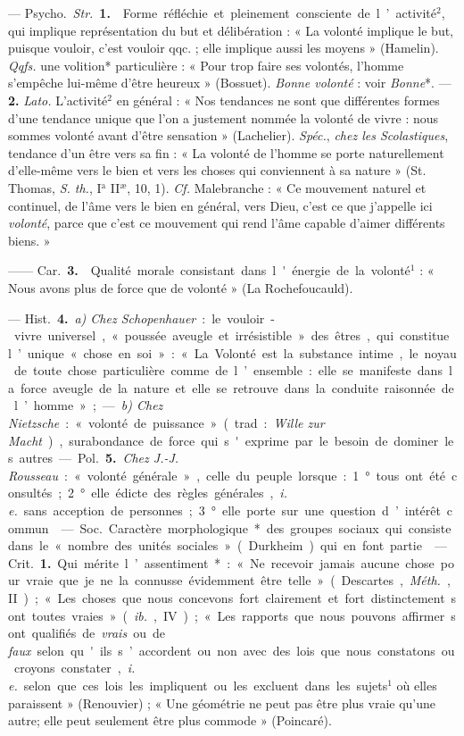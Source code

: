 \begin{itemize}[leftmargin=1cm, label=, itemsep=1pt]
 — \si{Psycho.} {\it Str.} {\bf 1.}  Forme
réfléchie et pleinement consciente de l’activité$^2$, qui implique
représentation du but et délibération : « La volonté implique le but, puisque
vouloir, c’est vouloir qqc. ; elle implique aussi les moyens » (Hamelin).
{\it Qqfs.}  une volition* particulière : « Pour trop faire
ses volontés, l’homme s’empêche lui-même d’être heureux » (Bossuet). {\it
Bonne volonté} : voir {\it Bonne}*. —  {\bf 2.}  {\it Lato.}
L'activité$^2$ en général : « Nos tendances ne sont que différentes formes
d’une tendance unique que l’on a justement nommée la volonté de vivre : nous
sommes volonté avant d'être sensation » (Lachelier). {\it Spéc.}, {\it chez
les Scolastiques}, tendance d’un être vers sa fin : « La volonté de l’homme
se porte naturellement d'elle-même vers le bien et vers les choses qui
conviennent à sa nature » (St. Thomas, {\it S. th.}, I$^\text{a}$
II$^\text{æ}$, 10, 1). {\it Cf.} Malebranche : « Ce mouvement naturel et
continuel, de l'âme vers le bien en général, vers Dieu, c’est ce que
j'appelle ici {\it volonté}, parce que c’est ce mouvement qui rend l'âme
capable d'aimer différents biens. »

—— \si{Car.} {\bf 3.}  Qualité morale consistant dans l'énergie de la
volonté$^1$ : « Nous avons plus de force que de volonté » (La Rochefoucauld).

— \si{Hist.}  {\bf 4.} {\it a) Chez Schopenhauer} : le vouloir-vivre
universel, « poussée aveugle et irrésistible » des êtres, qui constitue
l’unique « chose en soi » : « La Volonté est la substance intime, le noyau de
toute chose particulière comme de l’ensemble : elle se manifeste dans la
force aveugle de la
nature et elle se retrouve dans la conduite raisonnée de l’homme » ; —
{\it b) Chez Nietzsche} : « volonté de puissance » (trad. : {\it Wille zur
Macht}), surabondance de force qui s'exprime par le besoin de dominer les
autres.

— \si{Pol.}  {\bf 5.} {\it Chez J.-J. Rousseau} : « volonté générale », celle
du peuple lorsque : 1° tous ont été consultés; 2° elle édicte des règles
générales, {\it i. e.} sans acception de personnes; 3° elle porte sur une
question d’intérêt commun.

 — \si{Soc.} Caractère morphologique* des groupes sociaux
qui consiste dans le « nombre des unités sociales » (Durkheim) qui en font
partie.

 — \si{Crit.} {\bf 1.} Qui mérite l’assentiment* : « Ne recevoir
jamais aucune chose pour vraie que je ne la connusse évidemment être telle
» (Descartes, {\it Méth.}, II) ; « Les choses que nous concevons fort
clairement et fort distinctement sont toutes vraies » ({\it ib.}, IV) ; « Les
rapports que nous pouvons affirmer sont qualifiés de {\it vrais} ou de {\it
faux} selon qu'ils s’accordent ou non avec des lois que nous constatons ou
croyons constater, {\it i. e.} selon que ces lois les impliquent ou les
excluent dans les sujets$^1$ où elles paraissent » (Renouvier) ; « Une
géométrie ne peut pas être plus vraie qu’une autre; elle peut seulement être
plus commode » (Poincaré).


\end{itemize}

